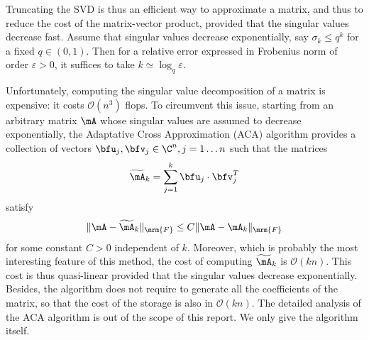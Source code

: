 Truncating the SVD is thus an efficient way to approximate a matrix, and thus to reduce the cost of the 
matrix-vector product, provided that  the singular values decrease fast. Assume that singular values decrease 
exponentially, say $\sigma_{k}\leq q^{k}$ for a fixed $q\in (0,1)$. Then for a relative error expressed in Frobenius norm of order $\varepsilon>0$,  
it suffices to take $k \simeq \log_q \varepsilon$. 

\bigskip
Unfortunately, computing the singular value decomposition  of a matrix is expensive: it costs $\mathcal{O}(n^{3})$ flops. To circumvent this issue, starting from 
an arbitrary matrix $\mA$ whose singular values are assumed to decrease exponentially, the Adaptative 
Cross Approximation (ACA) algorithm provides a collection of vectors $\bfu_{j},\bfv_{j}\in \C^{n}, j=1\dots n$ such that 
the matrices 
\begin{equation}
\label{eq:low_rank_decomposition}
\widetilde{\mA}_{k} = \sum_{j=1}^{k}\bfu_{j}\cdot\bfv_{j}^{T}
\end{equation} 
satisfy 
\[
\Vert \mA - \widetilde{\mA}_{k}\Vert_{\mrm{F}}\leq C \Vert \mA - \mA_{k}\Vert_{\mrm{F}}
\]
for some constant $C>0$ independent of $k$. Moreover, which is probably the most interesting feature of this method, 
the cost of computing $\widetilde{\mA}_{k}$ is $\mathcal{O}(kn)$. This cost is thus quasi-linear provided that the singular 
values  decrease exponentially. Besides, the algorithm does not require to generate all the coefficients of the matrix, so that the cost of the storage is also in $\mathcal{O}(kn)$. The detailed analysis of the ACA algorithm is out of the scope of this report. We only 
give the algorithm itself.

